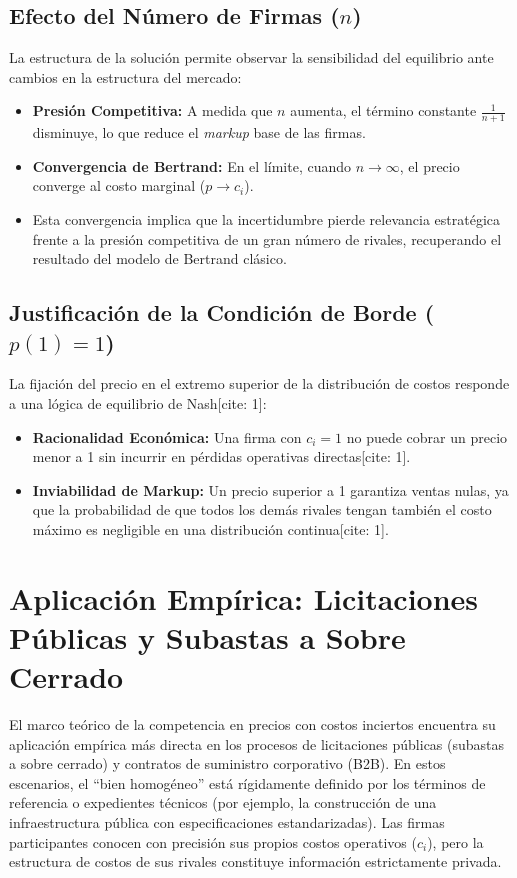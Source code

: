 \documentclass[12pt]{article}
\begin{document}
\subsection{Efecto del Número de Firmas ($n$)}
La estructura de la solución permite observar la sensibilidad del equilibrio ante cambios en la estructura del mercado:
\begin{itemize}
    \item \textbf{Presión Competitiva:} A medida que $n$ aumenta, el término constante $\frac{1}{n+1}$ disminuye, lo que reduce el \textit{markup} base de las firmas.
    \item \textbf{Convergencia de Bertrand:} En el límite, cuando $n \to \infty$, el precio converge al costo marginal ($p \to c_i$).
    \item Esta convergencia implica que la incertidumbre pierde relevancia estratégica frente a la presión competitiva de un gran número de rivales, recuperando el resultado del modelo de Bertrand clásico.
\end{itemize}

\subsection{Justificación de la Condición de Borde ($p(1)=1$)}
La fijación del precio en el extremo superior de la distribución de costos responde a una lógica de equilibrio de Nash[cite: 1]:
\begin{itemize}
    \item \textbf{Racionalidad Económica:} Una firma con $c_i = 1$ no puede cobrar un precio menor a 1 sin incurrir en pérdidas operativas directas[cite: 1].
    \item \textbf{Inviabilidad de Markup:} Un precio superior a 1 garantiza ventas nulas, ya que la probabilidad de que todos los demás rivales tengan también el costo máximo es negligible en una distribución continua[cite: 1].
\end{itemize}
\section{Aplicación Empírica: Licitaciones Públicas y Subastas a Sobre Cerrado}

El marco teórico de la competencia en precios con costos inciertos encuentra su aplicación empírica más directa en los procesos de licitaciones públicas (subastas a sobre cerrado) y contratos de suministro corporativo (B2B). En estos escenarios, el ``bien homogéneo'' está rígidamente definido por los términos de referencia o expedientes técnicos (por ejemplo, la construcción de una infraestructura pública con especificaciones estandarizadas). Las firmas participantes conocen con precisión sus propios costos operativos ($c_i$), pero la estructura de costos de sus rivales constituye información estrictamente privada. 
\end{document}
